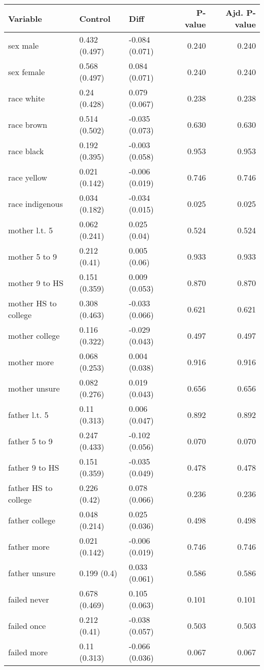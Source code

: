 \documentclass[
]{article}
\begin{document}
\begin{longtable}[t]{lllrr}
\toprule
Variable & Control & Diff & P-value & Ajd. P-value\\
\midrule\relax
sex male & 0.432 (0.497) & -0.084 (0.071) & 0.240 & 0.240\\
sex female & 0.568 (0.497) & 0.084 (0.071) & 0.240 & 0.240\\
race white & 0.24 (0.428) & 0.079 (0.067) & 0.238 & 0.238\\
race brown & 0.514 (0.502) & -0.035 (0.073) & 0.630 & 0.630\\
race black & 0.192 (0.395) & -0.003 (0.058) & 0.953 & 0.953\\
\addlinespace
race yellow & 0.021 (0.142) & -0.006 (0.019) & 0.746 & 0.746\\
race indigenous & 0.034 (0.182) & -0.034 (0.015) & 0.025 & 0.025\\
mother l.t. 5 & 0.062 (0.241) & 0.025 (0.04) & 0.524 & 0.524\\
mother 5 to 9 & 0.212 (0.41) & 0.005 (0.06) & 0.933 & 0.933\\
mother 9 to HS & 0.151 (0.359) & 0.009 (0.053) & 0.870 & 0.870\\
\addlinespace
mother HS to college & 0.308 (0.463) & -0.033 (0.066) & 0.621 & 0.621\\
mother college & 0.116 (0.322) & -0.029 (0.043) & 0.497 & 0.497\\
mother more & 0.068 (0.253) & 0.004 (0.038) & 0.916 & 0.916\\
mother unsure & 0.082 (0.276) & 0.019 (0.043) & 0.656 & 0.656\\
father l.t. 5 & 0.11 (0.313) & 0.006 (0.047) & 0.892 & 0.892\\
\addlinespace
father 5 to 9 & 0.247 (0.433) & -0.102 (0.056) & 0.070 & 0.070\\
father 9 to HS & 0.151 (0.359) & -0.035 (0.049) & 0.478 & 0.478\\
father HS to college & 0.226 (0.42) & 0.078 (0.066) & 0.236 & 0.236\\
father college & 0.048 (0.214) & 0.025 (0.036) & 0.498 & 0.498\\
father more & 0.021 (0.142) & -0.006 (0.019) & 0.746 & 0.746\\
\addlinespace
father unsure & 0.199 (0.4) & 0.033 (0.061) & 0.586 & 0.586\\
failed never & 0.678 (0.469) & 0.105 (0.063) & 0.101 & 0.101\\
failed once & 0.212 (0.41) & -0.038 (0.057) & 0.503 & 0.503\\
failed more & 0.11 (0.313) & -0.066 (0.036) & 0.067 & 0.067\\
\bottomrule
\end{longtable}
\end{document}
